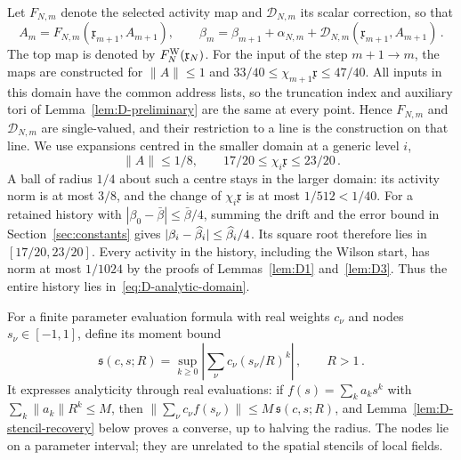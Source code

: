 Let $F_{N,m}$ denote the selected activity map and $\mathcal D_{N,m}$ its scalar correction, so that
\begin{equation*}
A_m=F_{N,m}(\mathfrak x_{m+1},A_{m+1}),\qquad
\beta_m=\beta_{m+1}+\alpha_{N,m}+\mathcal D_{N,m}(\mathfrak x_{m+1},A_{m+1})\,.
\end{equation*}
The top map is denoted by $F_N^{\rm W}(\mathfrak x_N)$. For the input of the step $m+1\to m$, the maps are constructed for $\|A\|\le1$ and $33/40\le\chi_{m+1}\mathfrak x\le47/40$. All inputs in this domain have the common address lists, so the truncation index and auxiliary tori of Lemma~\ref{lem:D-preliminary} are the same at every point. Hence $F_{N,m}$ and $\mathcal D_{N,m}$ are single-valued, and their restriction to a line is the construction on that line. We use expansions centred in the smaller domain at a generic level $i$,
\begin{equation}\label{eq:D-analytic-domain}
\|A\|\le1/8,\qquad 17/20\le\chi_i\mathfrak x\le23/20\,.
\end{equation}
A ball of radius $1/4$ about such a centre stays in the larger domain: its activity norm is at most $3/8$, and the change of $\chi_i\mathfrak x$ is at most $1/512<1/40$. For a retained history with $|\beta_0-\bar\beta|\le\bar\beta/4$, summing the drift and the error bound in Section~\ref{sec:constants} gives $|\beta_i-\widehat{\beta}_i|\le\widehat{\beta}_i/4$. Its square root therefore lies in $[17/20,23/20]$. Every activity in the history, including the Wilson start, has norm at most $1/1024$ by the proofs of Lemmas~\ref{lem:D1} and~\ref{lem:D3}. Thus the entire history lies in~\eqref{eq:D-analytic-domain}.

For a finite parameter evaluation formula with real weights $c_\nu$ and nodes $s_\nu\in[-1,1]$, define its moment bound
\begin{equation}\label{eq:D-real-stencil}
\mathfrak s(c,s;R)=\sup_{k\ge0}\left|\sum_\nu c_\nu(s_\nu/R)^k\right|\,,\qquad R>1\,.
\end{equation}
It expresses analyticity through real evaluations: if $f(s)=\sum_ka_ks^k$ with $\sum_k\|a_k\|R^k\le M$, then $\|\sum_\nu c_\nu f(s_\nu)\|\le M\,\mathfrak s(c,s;R)$, and Lemma~\ref{lem:D-stencil-recovery} below proves a converse, up to halving the radius. The nodes lie on a parameter interval; they are unrelated to the spatial stencils of local fields.

